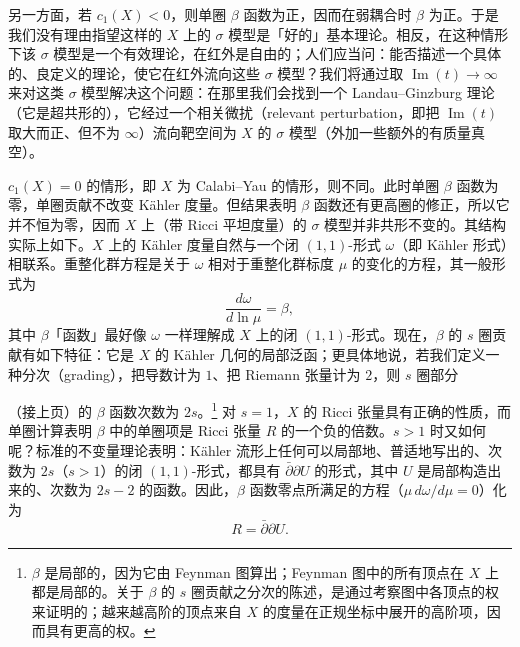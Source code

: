 另一方面，若 $c_1(X)<0$，则单圈 $\beta$ 函数为正，因而在弱耦合时 $\beta$ 为正。于是我们没有理由指望这样的 $X$ 上的 $\sigma$ 模型是「好的」基本理论。相反，在这种情形下该 $\sigma$ 模型是一个有效理论，在红外是自由的；人们应当问：能否描述一个具体的、良定义的理论，使它在红外流向这些 $\sigma$ 模型？我们将通过取 $\operatorname{Im}(t)\to\infty$ 来对这类 $\sigma$ 模型解决这个问题：在那里我们会找到一个 Landau--Ginzburg 理论（它是超共形的），它经过一个相关微扰（relevant perturbation，即把 $\operatorname{Im}(t)$ 取大而正、但不为 $\infty$）流向靶空间为 $X$ 的 $\sigma$ 模型（外加一些额外的有质量真空）。

$c_1(X)=0$ 的情形，即 $X$ 为 Calabi--Yau 的情形，则不同。此时单圈 $\beta$ 函数为零，单圈贡献不改变 Kähler 度量。但结果表明 $\beta$ 函数还有更高圈的修正，所以它并不恒为零，因而 $X$ 上（带 Ricci 平坦度量）的 $\sigma$ 模型并非共形不变的。其结构实际上如下。$X$ 上的 Kähler 度量自然与一个闭 $(1,1)$-形式 $\omega$（即 Kähler 形式）相联系。重整化群方程是关于 $\omega$ 相对于重整化群标度 $\mu$ 的变化的方程，其一般形式为
\[
\frac{d\omega}{d\ln\mu}=\beta,
\]
其中 $\beta$「函数」最好像 $\omega$ 一样理解成 $X$ 上的闭 $(1,1)$-形式。现在，$\beta$ 的 $s$ 圈贡献有如下特征：它是 $X$ 的 Kähler 几何的局部泛函；更具体地说，若我们定义一种分次（grading），把导数计为 $1$、把 Riemann 张量计为 $2$，则 $s$ 圈部分



（接上页）的 $\beta$ 函数次数为 $2s$。\footnote{$\beta$ 是局部的，因为它由 Feynman 图算出；Feynman 图中的所有顶点在 $X$ 上都是局部的。关于 $\beta$ 的 $s$ 圈贡献之分次的陈述，是通过考察图中各顶点的权来证明的；越来越高阶的顶点来自 $X$ 的度量在正规坐标中展开的高阶项，因而具有更高的权。} 对 $s=1$，$X$ 的 Ricci 张量具有正确的性质，而单圈计算表明 $\beta$ 中的单圈项是 Ricci 张量 $R$ 的一个负的倍数。$s>1$ 时又如何呢？标准的不变量理论表明：Kähler 流形上任何可以局部地、普适地写出的、次数为 $2s$（$s>1$）的闭 $(1,1)$-形式，都具有 $\bar\partial\partial U$ 的形式，其中 $U$ 是局部构造出来的、次数为 $2s-2$ 的函数。因此，$\beta$ 函数零点所满足的方程（$\mu\,d\omega/d\mu=0$）化为
\[
R=\bar\partial\partial U.
\]

